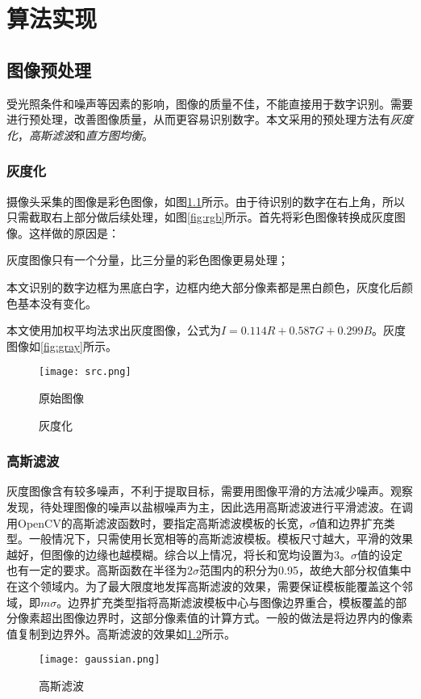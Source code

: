 
\chapter{算法实现}

\section{图像预处理}

受光照条件和噪声等因素的影响，图像的质量不佳，不能直接用于数字识别。需要进行预处理，改善图像质量，从而更容易识别数字。本文采用的预处理方法有\emph{灰度化}，\emph{高斯滤波}和\emph{直方图均衡}。

\subsection{灰度化}



摄像头采集的图像是彩色图像，如图\ref{fig:src}所示。由于待识别的数字在右上角，所以只需截取右上部分做后续处理，如图\ref{fig:rgb}所示。首先将彩色图像转换成灰度图像。这样做的原因是：
\begin{asparaenum}[(1)]
\item 灰度图像只有一个分量，比三分量的彩色图像更易处理；
\item 本文识别的数字边框为黑底白字，边框内绝大部分像素都是黑白颜色，灰度化后颜色基本没有变化。
\end{asparaenum}

本文使用加权平均法求出灰度图像，公式为$I=0.114R+0.587G+0.299B$。灰度图像如\ref{fig:gray}所示。
\begin{figure}[h]
  \centering
  \texttt{[image: src.png]}
  \caption{原始图像}
  \label{fig:src}
\end{figure}
\begin{figure}[h]
  \centering
  \hspace{1in}
  \caption{灰度化}
\end{figure}

\subsection{高斯滤波}


灰度图像含有较多噪声，不利于提取目标，需要用图像平滑的方法减少噪声。观察发现，待处理图像的噪声以盐椒噪声为主，因此选用高斯滤波进行平滑滤波。在调用OpenCV的高斯滤波函数时，要指定高斯滤波模板的长宽，$\sigma$值和边界扩充类型。一般情况下，只需使用长宽相等的高斯滤波模板。模板尺寸越大，平滑的效果越好，但图像的边缘也越模糊。综合以上情况，将长和宽均设置为3。$\sigma$值的设定也有一定的要求。高斯函数在半径为$2\sigma$范围内的积分为0.95，故绝大部分权值集中在这个领域内。为了最大限度地发挥高斯滤波的效果，需要保证模板能覆盖这个邻域，即$m\sigma$。边界扩充类型指将高斯滤波模板中心与图像边界重合，模板覆盖的部分像素超出图像边界时，这部分像素值的计算方式。一般的做法是将边界内的像素值复制到边界外。高斯滤波的效果如\ref{fig:gauss}所示。
\begin{figure}[h]
  \centering
  \texttt{[image: gaussian.png]}
  \caption{高斯滤波}
  \label{fig:gauss}
\end{figure}

